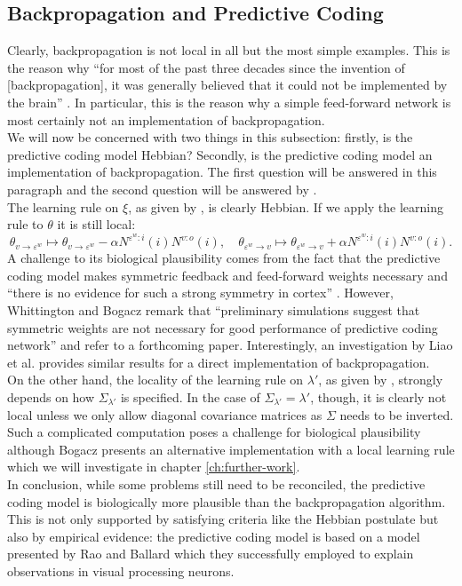 \documentclass[a4paper,11pt]{report}
\begin{document}
\subsection{Backpropagation and Predictive Coding}\label{subsec:theory-learning-comp}

\begin{Par}
Clearly, backpropagation is not local in all but the most simple examples. This is the reason why "`for most of the  past three decades since the invention of [backpropagation], it was generally believed that it could not be implemented by the brain"' \cite[][1837]{Liao2015}. In particular, this is the reason why a simple feed-forward network is most certainly not an implementation of backpropagation.\\
We will now be concerned with two things in this subsection: firstly, is the predictive coding model Hebbian? Secondly, is the predictive coding model an implementation of backpropagation. The first question will be answered in this paragraph and the second question will be answered by .\\
The learning rule on $\xi$, as given by , is clearly Hebbian. If we apply the learning rule to $\theta$ it is still local:
\[
\theta_{v\to \varepsilon^w}\mapsto \theta_{v\to\varepsilon^w}-\alpha N^{\varepsilon^w:i}(i)N^{v:o}(i),
\quad
\theta_{\varepsilon^w\to v}\mapsto\theta_{\varepsilon^w\to v}+\alpha N^{\varepsilon^w:i}(i)N^{v:o}(i).
\]
A challenge to its biological plausibility comes from the fact that the predictive coding model makes symmetric feedback and feed-forward weights necessary and "`there is no evidence for such a strong symmetry in cortex"' \cite[][1254]{Whittington2017}. However, Whittington and Bogacz remark that "`preliminary simulations suggest that symmetric weights are not necessary for good performance of predictive coding network"' \cite[][1254]{Whittington2017} and refer to a forthcoming paper. Interestingly, an investigation by Liao et al. \cite{Liao2015} provides similar results for a direct implementation of backpropagation.\\
On the other hand, the locality of the learning rule on $\lambda'$, as given by , strongly depends on how $\Sigma_{\lambda'}$ is specified. In the case of $\Sigma_{\lambda'}=\lambda'$, though, it is clearly not local unless we only allow diagonal covariance matrices as $\Sigma$ needs to be inverted. Such a complicated computation poses a challenge for biological plausibility although Bogacz \cite{Bogacz2017} presents an alternative implementation with a local learning rule which we will investigate in chapter \ref{ch:further-work}.\\
In conclusion, while some problems still need to be reconciled, the predictive coding model is biologically more plausible than the backpropagation algorithm. This is not only supported by satisfying criteria like the Hebbian postulate but also by empirical evidence: the predictive coding model is based on a model presented by Rao and Ballard \cite{Rao1999} which they successfully employed to explain observations in visual processing neurons.
\end{Par}
\end{document}
